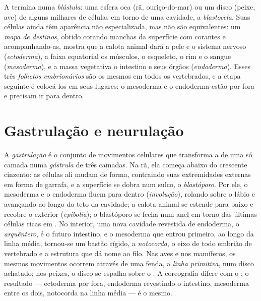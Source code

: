 \begin{definition}[Blástula]\label{def:b2:vertebrate-development:blastula}
A  termina numa \emph{blástula}: uma esfera oca (rã,
ouriço-do-mar) ou um disco (peixe, ave) de alguns milhares de células
em torno de uma cavidade, a \emph{blastocela}. Suas células ainda têm
aparência não especializada, mas não são equivalentes: um \emph{mapa de
destinos}, obtido corando manchas da superfície com corantes e
acompanhando-as, mostra que a calota animal dará a pele e o sistema
nervoso (\emph{ectoderma}), a faixa equatorial os músculos, o
esqueleto, o rim e o sangue (\emph{mesoderma}), e a massa vegetativa o
intestino e seus órgãos (\emph{endoderma}). Esses três \emph{folhetos
embrionários} são os mesmos em todos os vertebrados, e a etapa seguinte
é colocá-los em seus lugares: o mesoderma e o endoderma estão por fora
e precisam ir para dentro.
\end{definition}

\section{Gastrulação e neurulação}

\begin{proposition}[A gastrulação]\label{prop:b2:vertebrate-development:gastrulation}
A \emph{gastrulação} é o conjunto de movimentos celulares que
transforma a  de uma só camada numa \emph{gástrula} de três
camadas. Na rã, ela começa abaixo do crescente cinzento: as células ali
mudam de forma, contraindo suas extremidades externas em forma de
garrafa, e a superfície se dobra num sulco, o \emph{blastóporo}. Por
ele, o mesoderma e o endoderma fluem para dentro (\emph{involução}),
rolando sobre o lábio e avançando ao longo do teto da cavidade; a
calota animal se estende para baixo e recobre o exterior
(\emph{epibolia}); o blastóporo se fecha num anel em torno das últimas
células ricas em . No interior, uma nova cavidade revestida de
endoderma, o \emph{arquêntero}, é o futuro intestino, e o mesoderma
que entrou primeiro, ao longo da linha média, tornou-se um bastão
rígido, a \emph{notocorda}, o eixo de todo embrião de vertebrado e a
estrutura que dá nome ao filo. Nas aves e nos mamíferos, os mesmos
movimentos ocorrem através de uma fenda, a \emph{linha primitiva}, num
disco achatado; nos peixes, o disco se espalha sobre o . A
coreografia difere com o ; o resultado --- ectoderma por fora,
endoderma revestindo o intestino, mesoderma entre os dois, notocorda na
linha média --- é o mesmo.
\end{proposition}

